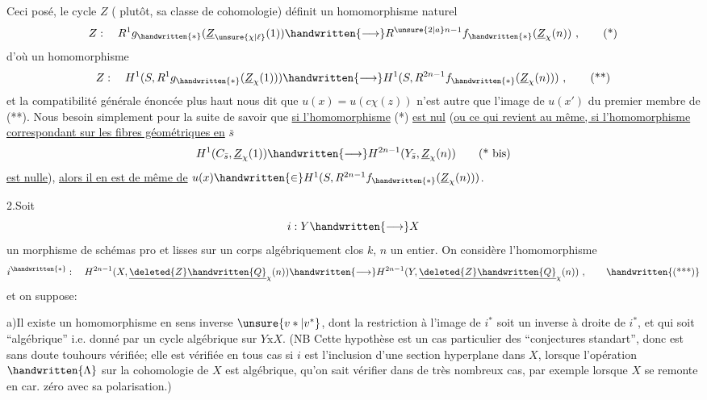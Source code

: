 Ceci posé, le cycle $Z$ ( plutôt, sa classe de cohomologie) définit un homomorphisme naturel
\[
Z:\quad R^1g_{\handwritten{*}}(\underline{Z}_{\unsure{\chi|\ell}}(1))\handwritten{\longrightarrow}R^{\unsure{2|a}n-1}f_{\handwritten{*}}(\underline{Z}_{\chi}(n))\ ,\tag*{(*)}
\]
d'où un homomorphisme
\[
Z:\quad H^1(S,R^1g_{\handwritten{*}}(\underline{Z}_{\chi}(1)))\handwritten{\longrightarrow}H^1(S,R^{2n-1}f_{\handwritten{*}}(\underline{Z}_{\chi}(n)))\ ,\tag*{(**)}
\]
et la compatibilité générale énoncée plus haut nous dit que $u(x)=u(c\chi(z))$ n'est autre que l'image de $u(x')$ du premier membre de  (**). Nous  besoin simplement pour la suite de savoir que \uline{si l'homomorphisme} (*) \uline{est nul} (\uline{ou ce qui revient au même, si l'homomorphisme correspondant sur les fibres géométriques en} $\bar s$ 
\[
H^1(C_{\bar s},\underline{Z}_{\chi}(1))\handwritten{\longrightarrow}H^{2n-1}(Y_{\bar s},\underline{Z}_{\chi}(n))\tag*{(* bis)}
\]
\uline{est nulle}), \uline{alors il en est de même de} $u(x)\handwritten{\in}H^1(S,R^{2n-1}f_{\handwritten{*}}(\underline{Z}_{\chi}(n)))$.

2.\quad Soit
\[
i:Y\handwritten{\longrightarrow}X
\]
un morphisme de schémas pro et lisses sur un corps algébriquement clos $k$, $n$ un entier. On  considère l'homomorphisme
\[
i^{\handwritten{*}}:\quad H^{2n-1}(X,\underline{\deleted{Z}\handwritten{Q}}_{\chi}(n))\handwritten{\longrightarrow}H^{2n-1}(Y,\underline{\deleted{Z}\handwritten{Q}}_{\chi}(n))\ ,\tag*{\handwritten{(***)}}
\]
et on suppose:

a)\quad Il existe un homomorphisme en sens inverse $\unsure{v*|v^*}$, dont la restriction à l'image de $i^*$ soit un inverse à droite de $i^*$, et qui soit ``algébrique'' i.e. donné par un cycle algébrique sur $Y\mathbin{\mathrm{x}}X$. (NB Cette hypothèse est un cas particulier des ``conjectures standart'', donc est sans doute touhours vérifiée; elle est vérifiée en tous cas si $i$ est l'inclusion d'une section hyperplane dans $X$, lorsque l'opération $\handwritten{\Lambda}$ sur  la cohomologie de $X$ est algébrique,   qu'on sait vérifier dans de très nombreux cas, par exemple lorsque $X$ se remonte en car. zéro avec sa polarisation.)
